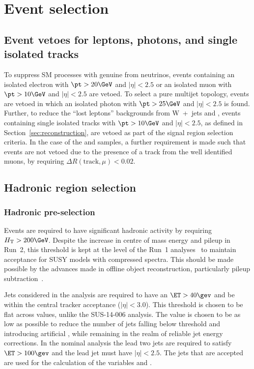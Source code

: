 \section{Event selection}
\label{sec:selection}

\subsection{Event vetoes for leptons, photons, and single isolated tracks\label{sec:vetoes}}

To suppress SM processes with genuine \met from neutrinos, events
containing an isolated electron with $\pt > 20\GeV$ and $|\eta| < 2.5$ or an isolated muon
with $\pt > 10\GeV$ and $|\eta| < 2.5$ are vetoed. To select a pure
multijet topology, events are vetoed in which an isolated
photon with $\pt > 25\GeV$ and $|\eta| < 2.5$ is
found.  Further, to reduce the ``lost leptons'' backgrounds from W~+~jets 
and \ttbar, events containing single isolated tracks with $\pt >
10\GeV$ and $|\eta| < 2.5$, as defined in
Section~\ref{sec:reconstruction}, are vetoed as part of the signal
region selection criteria. In the case of the \mj and \mmj
samples, a further requirement is made such that events are not vetoed
due to the presence of a track from the well identified muons, by
requiring $\Delta R(\textrm{track},\mu) < 0.02$.


\subsection{Hadronic region selection}

\subsubsection{Hadronic pre-selection}
Events are required to have significant hadronic activity by requiring
$\scalht > 200\GeV$. Despite the increase in centre of mass energy and pileup
in Run~2, this threshold is kept at the level of the Run~1 analyses~\cite{run1Analyses}  
to maintain acceptance for SUSY models with compressed spectra. This should be
made possible by the advances made in offline object reconstruction, particularly pileup
subtraction~\cite{puppi}.

Jets considered in the analysis are required to have an $\ET>40\gev$ and be
within the central tracker acceptance ($|\eta|<3.0$). This threshold is chosen
to be flat across \HT values, unlike the SUS-14-006 analysis. The \ET value is
chosen to be as low as possible to reduce the number of jets falling below
threshold and introducing artificial \mht, while remaining in the realm of
reliable jet energy corrections. In the nominal analysis the lead two jets 
are required to satisfy $\ET>100\gev$ and the lead jet must
have $|\eta|<2.5$. The jets that are accepted are used for the calculation of
the variables \HT and \mht.

